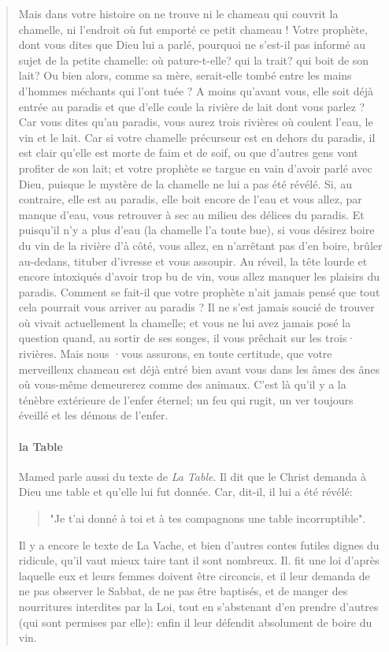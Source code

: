 \begin{quote}
Mais dans votre histoire on ne trouve ni le chameau qui couvrit la chamelle, ni l'endroit où fut emporté ce petit chameau ! Votre prophète, dont vous dites que Dieu lui a parlé, pourquoi ne s'est-il pas informé au sujet de la petite chamelle: où pature-t-elle? qui la trait? qui boit de son lait? Ou bien alors, comme sa mère, serait-elle tombé entre les mains d'hommes méchants qui l'ont tuée ? A moins qu'avant vous, elle soit déjà entrée au paradis et que d'elle coule la rivière de lait dont vous parlez ? Car vous dites qu'au paradis, vous aurez trois rivières où coulent l'eau, le vin et le lait. Car si votre chamelle précurseur est en dehors du paradis, il est clair qu'elle est morte de faim et de soif, ou que d'autres gens vont profiter de son lait; et votre prophète se targue en vain d'avoir parlé avec Dieu, puisque le mystère de la chamelle ne lui a pas été révélé. Si, au contraire, elle est au paradis, elle boit encore de l'eau et vous allez, par manque d'eau, vous retrouver à sec au milieu des délices du paradis. Et puisqu'il n'y a plus d'eau (la chamelle l'a toute bue), si vous désirez boire du vin de la rivière d'à côté, vous allez, en n'arrêtant pas d'en boire, brûler au-dedans, tituber d'ivresse et vous assoupir. Au réveil, la tête lourde et encore intoxiqués d'avoir trop bu de vin, vous allez manquer les plaisirs du paradis. Comment se fait-il que votre prophète n'ait jamais pensé que tout cela pourrait vous arriver au paradis ? Il ne s'est jamais soucié de trouver où vivait actuellement la chamelle; et vous ne lui avez jamais posé la question quand, au sortir de ses songes, il vous prêchait sur les trois· rivières. Mais nous ·vous assurons, en toute certitude, que votre merveilleux chameau est déjà entré bien avant vous dans les âmes des ânes où vous-même demeurerez comme des animaux. C'est là qu'il y a la ténèbre extérieure de l'enfer éternel; un feu qui rugit, un ver toujours éveillé et les démons de l'enfer.
\paragraph{la Table}
Mamed parle aussi du texte de \textit{La Table}. Il dit que le Christ demanda à Dieu une table et qu'elle lui fut donnée. Car, dit-il, il lui a été révélé: \begin{quote}
    "Je t'ai donné à toi et à tes compagnons une table incorruptible".
\end{quote}

Il y a encore le texte de La Vache, et bien d'autres contes futiles dignes du ridicule, qu'il vaut mieux taire tant il sont nombreux. Il. fit une loi d'après laquelle eux et leurs femmes doivent être circoncis, et il leur demanda de ne pas observer le Sabbat, de ne pas être baptisés, et de manger des nourritures interdites par la Loi, tout en s'abstenant d'en prendre d'autres (qui sont permises par elle): enfin il leur défendit absolument de boire du vin.


\end{quote}


